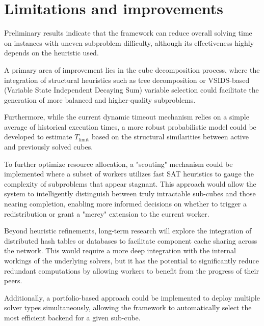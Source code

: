 \documentclass{report}
\begin{document}
\section{Limitations and improvements}
\vspace{-1.5em}
Preliminary results indicate that the framework can reduce overall solving time 
on instances with uneven subproblem difficulty, although its effectiveness 
highly depends on the heuristic used.

A primary area of improvement lies in the cube decomposition process, 
where the integration of structural heuristics such as tree decomposition or VSIDS-based \cite{VSIDS}(Variable State Independent Decaying Sum) variable 
selection could facilitate the generation of more balanced and higher-quality subproblems. 

Furthermore, while the current dynamic timeout mechanism relies on a 
simple average of historical execution times, a more robust probabilistic 
model could be developed to estimate ${T_\text{limit}}$ based on the structural similarities between active and previously solved cubes.

To further optimize resource allocation, a "scouting" mechanism could be 
implemented where a subset of workers utilizes fast SAT heuristics 
to gauge the complexity of subproblems that appear stagnant. 
This approach would allow the system to intelligently distinguish between 
truly intractable sub-cubes and those nearing completion, enabling 
more informed decisions on whether to trigger a redistribution or grant a "mercy" extension to the current worker.

Beyond heuristic refinements, long-term research will explore the 
integration of distributed hash tables or databases to facilitate component cache sharing across the network. 
This would require a more deep integration with the internal workings of the underlying solvers,
but it has the potential to significantly reduce redundant computations by allowing workers to benefit from the progress of their peers.

Additionally, a portfolio-based approach could be implemented to deploy multiple solver types simultaneously,
allowing the framework to automatically select the most efficient backend for a given sub-cube.
\newpage
\printbibliography[heading=bibintoc, title={Bibliography}]
    
\end{document}
